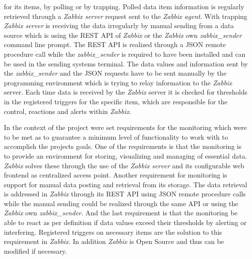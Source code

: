 for its items, by polling or by trapping. Polled data item information is regularly retrieved through a \textit{Zabbix server} request sent to the \textit{Zabbix agent}. With trapping \textit{Zabbix server} is receiving the data irregularly by manual sending from a data source which is using the REST API of \textit{Zabbix} or the \textit{Zabbix} own \textit{zabbix\_sender} command line prompt. The REST API is realized through a JSON remote procedure call while the \textit{zabbix\_sender} is required to have been installed and can be used in the sending systems terminal. The data values and information sent by the \textit{zabbix\_sender} and the JSON requests have to be sent manually by the programming environment which is trying to relay information to the \textit{Zabbix} server. Each time data is received by the \textit{Zabbix} server it is checked for thresholds in the registered triggers for the specific item, which are responsible for the control, reactions and alerts within \textit{Zabbix}.\cite{zab2, zab3}
	
	In the context of the project were set requirements for the monitoring which were to be met as to guarantee a minimum level of functionality to work with to accomplish the projects goals. One of the requirements is that the monitoring is to provide an environment for storing, visualizing and managing of essential data. \textit{Zabbix} solves these through the use of the \textit{Zabbix server} and its configurable web frontend as centralized access point. Another requirement for monitoring is support for manual data posting and retrieval from its storage. The data retrieval is addressed in \textit{Zabbix} through its REST API using JSON remote procedure calls while the manual sending could be realized through the same API or using the \textit{Zabbix} own \textit{zabbix\_sender}. And the last requirement is that the monitoring be able to react as per definition if data values exceed their thresholds by alerting or interfering. Registered triggers on necessary items are the solution to this requirement in \textit{Zabbix}. In addition \textit{Zabbix} is Open Source and thus can be modified if necessary.
